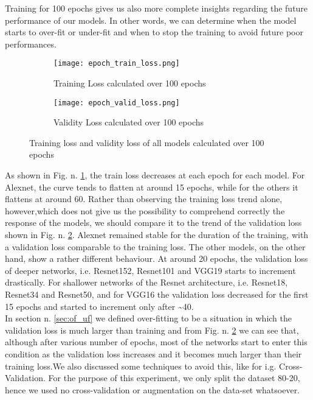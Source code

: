 Training for 100 epochs gives us also more complete insights regarding the future performance of our models. In other words, we can determine when the model starts to over-fit or under-fit and when to stop the training to avoid future poor performances. \\
\begin{figure}[h]
\begin{subfigure}{0.5\textwidth}
	    \texttt{[image: epoch\_train\_loss.png]}
	    \caption{Training Loss calculated over 100 epochs}
        \label{fig:train_loss}
        
     \end{subfigure} \hfill
     \begin{subfigure}{0.5\textwidth}
	    \texttt{[image: epoch\_valid\_loss.png]}
	    \caption{Validity Loss calculated over 100 epochs}
         \label{fig:valid_loss}
         
     \end{subfigure}
    
     
     \caption{ Training loss and validity loss of all models calculated over 100 epochs}
        \label{fig:tran_valid_loss}
\end{figure}


As shown in Fig. n. \ref{fig:train_loss}, the train loss decreases at each epoch for each model. For Alexnet, the curve tends to flatten at around 15 epochs, while for the others it flattens at around 60. Rather than observing the training loss trend alone, however,which does not give us the possibility to comprehend correctly the response of the models, we should compare it to the trend of the validation loss shown in Fig. n. \ref{fig:valid_loss}. Alexnet remained stable for the duration of the training, with a validation loss comparable to the training loss. The other models, on the other hand, show a rather different behaviour. At around 20 epochs, the validation loss of deeper networks, i.e. Resnet152, Resnet101 and VGG19 starts to increment drastically. For shallower networks of the Resnet architecture, i.e. Resnet18, Resnet34 and Resnet50, and for VGG16 the validation loss decreased for the first 15 epochs and started to increment only after \textasciitilde40.\\
In section n. \ref{sec:of_uf} we defined over-fitting to be a situation in which the validation loss is much larger than training and from Fig. n. \ref{fig:valid_loss} we can see that, although after various number of epochs, most of the networks start to enter this condition as the validation loss increases and it becomes much larger than their training loss.We also discussed some techniques to avoid this, like for i.g. Cross-Validation. For the purpose of this experiment, we only split the dataset 80-20, hence we used no cross-validation or augmentation on the data-set whatsoever. \\
 
